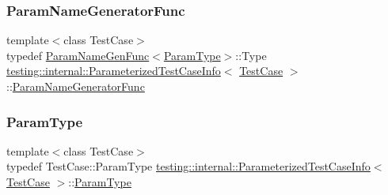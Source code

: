 \mbox{\label{classtesting_1_1internal_1_1_parameterized_test_case_info_aed6c5184cb8f94cec73e9d7c4b7fa2ce}} 
\subsubsection{\texorpdfstring{ParamNameGeneratorFunc}{ParamNameGeneratorFunc}}
{\footnotesize\ttfamily template$<$class Test\+Case$>$ \\
typedef \mbox{\hyperlink{structtesting_1_1internal_1_1_param_name_gen_func}{Param\+Name\+Gen\+Func}}$<$\mbox{\hyperlink{classtesting_1_1internal_1_1_parameterized_test_case_info_a643a87e178bf92a4246ce21054e44b96}{Param\+Type}}$>$\+::Type \mbox{\hyperlink{classtesting_1_1internal_1_1_parameterized_test_case_info}{testing\+::internal\+::\+Parameterized\+Test\+Case\+Info}}$<$ \mbox{\hyperlink{classtesting_1_1_test_case}{Test\+Case}} $>$\+::\mbox{\hyperlink{classtesting_1_1internal_1_1_parameterized_test_case_info_aed6c5184cb8f94cec73e9d7c4b7fa2ce}{Param\+Name\+Generator\+Func}}}

\mbox{\label{classtesting_1_1internal_1_1_parameterized_test_case_info_a643a87e178bf92a4246ce21054e44b96}} 
\subsubsection{\texorpdfstring{ParamType}{ParamType}}
{\footnotesize\ttfamily template$<$class Test\+Case$>$ \\
typedef Test\+Case\+::\+Param\+Type \mbox{\hyperlink{classtesting_1_1internal_1_1_parameterized_test_case_info}{testing\+::internal\+::\+Parameterized\+Test\+Case\+Info}}$<$ \mbox{\hyperlink{classtesting_1_1_test_case}{Test\+Case}} $>$\+::\mbox{\hyperlink{classtesting_1_1internal_1_1_parameterized_test_case_info_a643a87e178bf92a4246ce21054e44b96}{Param\+Type}}}

